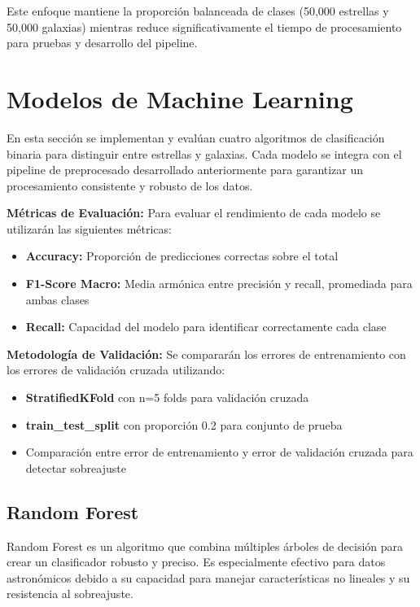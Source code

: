 \documentclass{article}
\begin{document}
Este enfoque mantiene la proporción balanceada de clases (50,000 estrellas y 50,000 galaxias) mientras reduce significativamente el tiempo de procesamiento para pruebas y desarrollo del pipeline.

\newpage

\section{Modelos de Machine Learning}

En esta sección se implementan y evalúan cuatro algoritmos de clasificación binaria para distinguir entre estrellas y galaxias. Cada modelo se integra con el pipeline de preprocesado desarrollado anteriormente para garantizar un procesamiento consistente y robusto de los datos.

\textbf{Métricas de Evaluación:}
Para evaluar el rendimiento de cada modelo se utilizarán las siguientes métricas:
\begin{itemize}
    \item \textbf{Accuracy:} Proporción de predicciones correctas sobre el total
    \item \textbf{F1-Score Macro:} Media armónica entre precisión y recall, promediada para ambas clases
    \item \textbf{Recall:} Capacidad del modelo para identificar correctamente cada clase
\end{itemize}

\textbf{Metodología de Validación:}
Se compararán los errores de entrenamiento con los errores de validación cruzada utilizando:
\begin{itemize}
    \item \textbf{StratifiedKFold} con n=5 folds para validación cruzada
    \item \textbf{train\_test\_split} con proporción 0.2 para conjunto de prueba
    \item Comparación entre error de entrenamiento y error de validación cruzada para detectar sobreajuste
\end{itemize}

\subsection{Random Forest}

Random Forest es un algoritmo que combina múltiples árboles de decisión para crear un clasificador robusto y preciso. Es especialmente efectivo para datos astronómicos debido a su capacidad para manejar características no lineales y su resistencia al sobreajuste.
\end{document}
